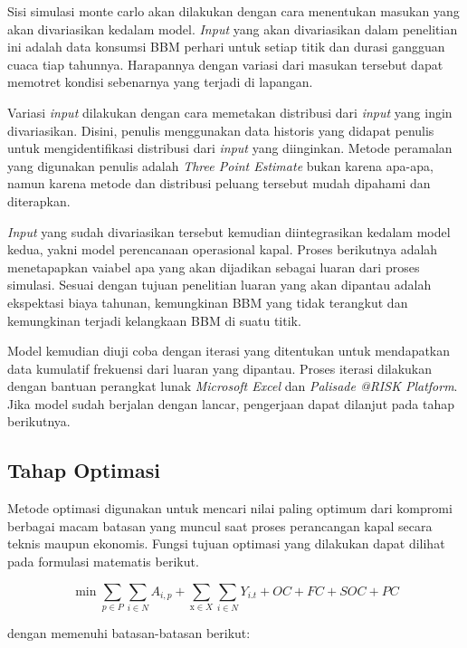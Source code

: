     Sisi simulasi monte carlo akan dilakukan dengan cara menentukan masukan yang akan divariasikan kedalam model. \emph{Input} yang akan divariasikan dalam penelitian ini adalah data konsumsi BBM perhari untuk setiap titik dan durasi gangguan cuaca tiap tahunnya. Harapannya dengan variasi dari masukan tersebut dapat memotret kondisi sebenarnya yang terjadi di lapangan.

    Variasi \emph{input} dilakukan dengan cara memetakan distribusi dari \emph{input} yang ingin divariasikan. Disini, penulis menggunakan data historis yang didapat penulis untuk mengidentifikasi distribusi dari \emph{input} yang diinginkan. Metode peramalan yang digunakan penulis adalah \emph{Three Point Estimate} bukan karena apa-apa, namun karena metode dan distribusi peluang tersebut mudah dipahami dan diterapkan.

    \emph{Input} yang sudah divariasikan tersebut kemudian diintegrasikan kedalam model kedua, yakni model perencanaan operasional kapal. Proses berikutnya adalah menetapapkan vaiabel apa yang akan dijadikan sebagai luaran dari proses simulasi. Sesuai dengan tujuan penelitian luaran yang akan dipantau adalah ekspektasi biaya tahunan, kemungkinan BBM yang tidak terangkut dan kemungkinan terjadi kelangkaan BBM di suatu titik.

    Model kemudian diuji coba dengan iterasi yang ditentukan untuk mendapatkan data kumulatif frekuensi dari luaran yang dipantau. Proses iterasi dilakukan dengan bantuan perangkat lunak \emph{Microsoft Excel} dan \emph{Palisade @RISK Platform}. Jika model sudah berjalan dengan lancar, pengerjaan dapat dilanjut pada tahap berikutnya.

\subsection{Tahap Optimasi}
\label{subsec:tahap-optimasi}

    Metode optimasi digunakan untuk mencari nilai paling optimum dari kompromi berbagai macam batasan yang muncul saat proses perancangan kapal secara teknis maupun ekonomis. Fungsi tujuan optimasi yang dilakukan dapat dilihat pada formulasi matematis berikut.

    \begin{equation}
        \min\sum_{p\in P}\sum_{i\in N}A_{i,p}+\sum_{\mathrm{x}\in X}\sum_{i\in N}Y_{i.t}+OC+FC+SOC+PC
        \label{model-matematis-optimasi}
    \end{equation}

     dengan memenuhi batasan-batasan berikut:

